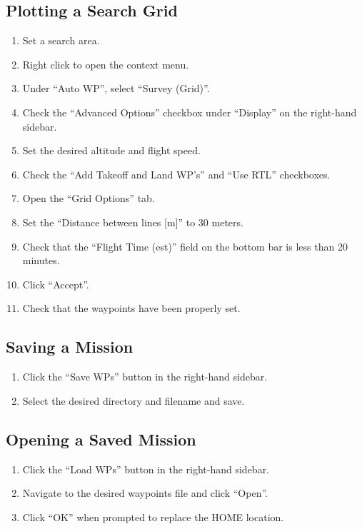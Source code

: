 \documentclass{report}
\begin{document}
		\subsection{Plotting a Search Grid}
			\begin{enumerate}
				\item Set a search area.
				\item Right click to open the context menu.
				\item Under ``Auto WP'', select ``Survey (Grid)''.
				\item Check the ``Advanced Options'' checkbox under ``Display'' on the right-hand sidebar.
				\item Set the desired altitude and flight speed.
				\item Check the ``Add Takeoff and Land WP's'' and ``Use RTL'' checkboxes.
				\item Open the ``Grid Options'' tab.
				\item Set the ``Distance between lines [m]'' to 30 meters.
				\item Check that the ``Flight Time (est)'' field on the bottom bar is less than 20 minutes.
				\item Click ``Accept''.
				\item Check that the waypoints have been properly set.
			\end{enumerate}
		\subsection{Saving a Mission}
			\begin{enumerate}
				\item Click the ``Save WPs'' button in the right-hand sidebar.
				\item Select the desired directory and filename and save.
			\end{enumerate}
		\subsection{Opening a Saved Mission}
			\begin{enumerate}
				\item Click the ``Load WPs'' button in the right-hand sidebar.
				\item Navigate to the desired waypoints file and click ``Open''.
				\item Click ``OK'' when prompted to replace the HOME location.
			\end{enumerate}
\end{document}
